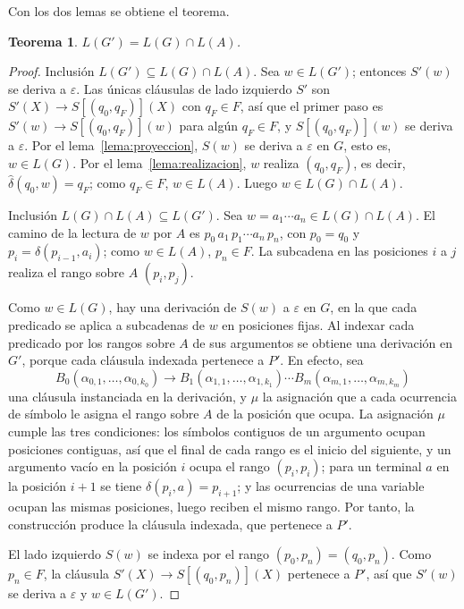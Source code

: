 \documentclass{report}
\theoremstyle{definition}
\theoremstyle{plain}
\newtheorem{teorema}{Teorema}[chapter]
\begin{document}
Con los dos lemas se obtiene el teorema.

\begin{teorema}\label{teo:correctitud}
$L(G') = L(G) \cap L(A)$.
\end{teorema}

\begin{proof}
Inclusión $L(G') \subseteq L(G) \cap L(A)$. Sea $w \in L(G')$;
entonces $S'(w)$ se deriva a $\varepsilon$. Las únicas cláusulas de
lado izquierdo $S'$ son $S'(X) \to S[(q_0, q_F)](X)$ con $q_F \in F$, así que el
primer paso es $S'(w) \to S[(q_0, q_F)](w)$ para algún $q_F \in F$, y
$S[(q_0, q_F)](w)$ se deriva a $\varepsilon$. Por el
lema~\ref{lema:proyeccion}, $S(w)$ se deriva a $\varepsilon$ en $G$, esto
es, $w \in L(G)$. Por el lema~\ref{lema:realizacion}, $w$ realiza
$(q_0, q_F)$, es decir, $\hat\delta(q_0, w) = q_F$; como $q_F \in F$,
$w \in L(A)$. Luego $w \in L(G) \cap L(A)$.

Inclusión $L(G) \cap L(A) \subseteq L(G')$. Sea
$w = a_1 \cdots a_n \in L(G) \cap L(A)$. El camino de la lectura de $w$
por $A$ es $p_0\,a_1\,p_1 \cdots a_n\,p_n$, con $p_0 = q_0$ y
$p_i = \delta(p_{i-1}, a_i)$; como $w \in L(A)$, $p_n \in F$. La subcadena
en las posiciones $i$ a $j$ realiza el rango sobre $A$ $(p_i, p_j)$.

Como $w \in L(G)$, hay una derivación de $S(w)$ a $\varepsilon$ en $G$,
en la que cada predicado se aplica a subcadenas de $w$ en posiciones
fijas. Al indexar cada predicado por los rangos sobre $A$ de sus
argumentos se obtiene una derivación en $G'$, porque cada cláusula
indexada pertenece a $P'$. En efecto, sea
\[
  B_0(\alpha_{0,1}, \ldots, \alpha_{0,k_0}) \to B_1(\alpha_{1,1}, \ldots, \alpha_{1,k_1}) \cdots B_m(\alpha_{m,1}, \ldots, \alpha_{m,k_m})
\]
una cláusula instanciada en la
derivación, y $\mu$ la asignación que a cada ocurrencia de símbolo le
asigna el rango sobre $A$ de la posición que ocupa. La asignación $\mu$
cumple las tres condiciones: los símbolos contiguos de un argumento
ocupan posiciones contiguas, así que el final de cada rango es el inicio
del siguiente, y un argumento vacío en la posición $i$ ocupa el rango
$(p_i, p_i)$; para un terminal $a$ en la posición $i{+}1$ se
tiene $\delta(p_i, a) = p_{i+1}$; y las ocurrencias de una
variable ocupan las mismas posiciones, luego reciben el mismo rango. Por tanto, la construcción produce la cláusula
indexada, que pertenece a $P'$.

El lado izquierdo $S(w)$ se indexa por el rango $(p_0, p_n) =
(q_0, p_n)$. Como $p_n \in F$, la cláusula
$S'(X) \to S[(q_0, p_n)](X)$ pertenece a $P'$, así que $S'(w)$ se
deriva a $\varepsilon$ y $w \in L(G')$.
\end{proof}
\end{document}
